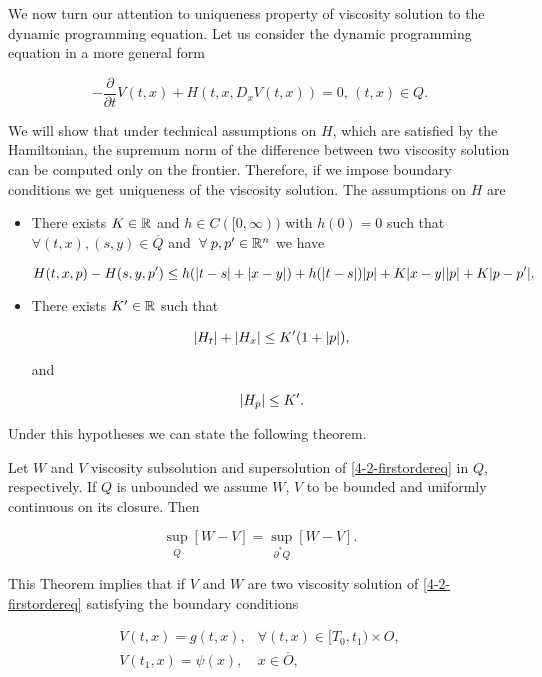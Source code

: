 We now turn our attention to uniqueness property of viscosity solution to the dynamic programming equation. Let us consider the dynamic programming equation 
in a more general form

\begin{equation}\label{4-2-firstordereq}
    -\frac{\partial}{\partial t}V(t,x) + H(t,x,D_xV(t,x)) = 0,\,(t,x)\in Q.
\end{equation}

We will show that under technical assumptions on $H$, which are satisfied by the Hamiltonian, the supremum norm of the difference between two viscosity solution 
can be computed only on the frontier. Therefore, if we impose boundary conditions we get uniqueness of the viscosity solution. 
The assumptions on $H$ are

\begin{itemize}\label{4-2-Hassumptions}
    \item There exists $K\in\mathbb{R}$ and $h\in C([0,\infty))$ with $h(0)=0$ such that $\forall (t,x),(s,y)\in\overline{Q}$ and $\forall p,p'\in\R^n$ we have
    
    \[H(t,x,p)-H(s,y,p')\leq h(\abs{t-s}+\abs{x-y})+h(\abs{t-s})\abs{p}+K\abs{x-y}\abs{p} + K\abs{p-p'}.\]
    
    \item There exists $K'\in\mathbb{R}$ such that
    
    \[\abs{H_t}+\abs{H_x}\leq K'(1+\abs{p}),\]

    and

    \[\abs{H_p}\leq K'.\]
\end{itemize}

Under this hypotheses we can state the following theorem.

\begin{theorem}\label{4-2-Theo:Suponbound}
    Let $W$ and $V$ viscosity subsolution and supersolution of \ref{4-2-firstordereq} in $Q$, respectively. If $Q$ is unbounded we assume $W$, $V$ to be bounded and 
    uniformly continuous on its closure. Then
    
    \[\sup_{\overline{Q}}[W-V] = \sup_{\partial^{\ast}Q}[W-V].\]
\end{theorem}

This Theorem implies that if $V$ and $W$ are two viscosity solution of \ref{4-2-firstordereq} satisfying the boundary conditions

\begin{equation}\label{4-2-TerminalcondV}
    \begin{aligned}
        V(t,x) = g(t,x),&\forall(t,x)\in[T_0,t_1)\times O, \\
        V(t_1,x) = \psi(x),&x\in\overline{O},
    \end{aligned}
\end{equation}

